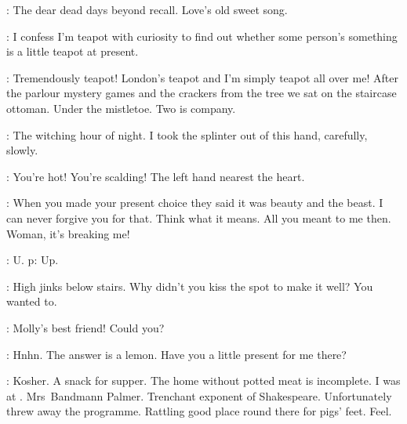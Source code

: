 \MrsBreen:
The dear dead days beyond recall.
Love's old sweet song.

\Bloom:
I confess I'm teapot with curiosity to find out
whether some person's something is a little teapot at present.

\MrsBreen:
Tremendously teapot!
London's teapot and I'm simply teapot all over me!
After the parlour mystery games and the crackers from the tree
we sat on the staircase ottoman.
Under the mistletoe.
Two is company.

\Bloom:
The witching hour of night.
I took the splinter out of this hand, carefully, slowly.

\MrsBreen:
You're hot! You're scalding!
The left hand nearest the heart.

\Bloom:
When you made your present choice
they said it was beauty and the beast.
I can never forgive you for that.
Think what it means.
All you meant to me then.
Woman, it's breaking me!


\AlfBergan:
U. p:
Up.

\MrsBreen:
High jinks below stairs.
Why didn't you kiss the spot to make it well?
You wanted to.

\Bloom:
Molly's best friend! Could you?

\MrsBreen:
Hnhn.
The answer is a lemon.
Have you a little present for me there?

\Bloom:
Kosher.
A snack for supper.
The home without potted meat is incomplete.
I was at .
Mrs~Bandmann Palmer.
Trenchant exponent of Shakespeare.
Unfortunately threw away the programme.
Rattling good place round there for pigs' feet.
Feel.

